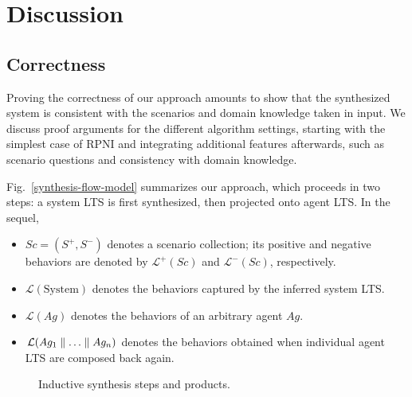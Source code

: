 \section{Discussion\label{section:inductive-discussion}}


\subsection{Correctness\label{subsection:inductive-discussion-correctness}}

Proving the correctness of our approach amounts to show that the synthesized system is consistent with the scenarios and domain knowledge taken in input. We discuss proof arguments for the different algorithm settings, starting with the simplest case of RPNI and integrating additional features afterwards, such as scenario questions and consistency with domain knowledge.

Fig.~\ref{synthesis-flow-model} summarizes our approach, which proceeds in two steps: a system LTS is first synthesized, then projected onto agent LTS. In the sequel,
\begin{itemize}
\item $Sc = (S^+,S^-)$ denotes a scenario collection; its positive and negative behaviors are denoted by $\mathcal{L}^+(Sc)$ and $\mathcal{L}^-(Sc)$, respectively.
\item $\mathcal{L}(\mbox{System})$ denotes the behaviors captured by the inferred system LTS.
\item $\mathcal{L}(Ag)$ denotes the behaviors of an arbitrary agent $Ag$.
\item $\mathcal{L}(Ag_1 \parallel \ldots \parallel Ag_n)$ denotes the behaviors obtained when individual agent LTS are composed back again.
\end{itemize}

\begin{figure}\centering
{}
\caption{Inductive synthesis steps and products.\label{figure:synthesis-flow-model}} 
\end{figure}

